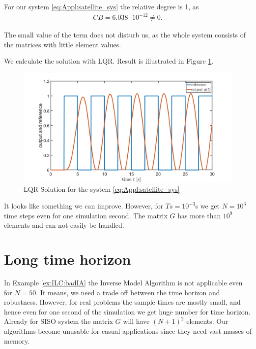 \begin{exam}
For our system \eqref{eq:Appl:satellite_sys} the relative degree is 1, as 
	\begin{align}
	CB = 6.038\cdot 10^{-12} \neq 0. 
	\end{align}

The small value of the term does not disturb us, as the whole system consists of the matrices with little element values. 

We calculate the solution with LQR. Result is illustrated in Figure \ref{img:Appl:ExSat_LQR}.
	
	\begin{figure}[ht]
		\centering
		\includegraphics[width=\textwidth]{fig/ExSat_LQR.jpg}
		\caption{LQR Solution for the system \eqref{eq:Appl:satellite_sys}}
		\label{img:Appl:ExSat_LQR}
	\end{figure}
	
It looks like something we can improve. However, for $Ts = 10^{-3}$s we get $N = 10^3$ time steps even for one simulation second. The matrix $G$ has more than  $10^9$ elements and can not easily be handled.
\end{exam}

\section{Long time horizon}

	In Example \ref{ex:ILC:badIA} the Inverse Model Algorithm is not applicable even for $N = 50$. 
	It means, we need a trade off between the time horizon and robustness.
	However, for real problems the sample times are mostly small, and hence even for one second of the simulation we get huge number for time horizon. Already for SISO system the matrix $G$ will have $(N + 1)^2$ elements. Our algorithms become unusable for casual applications since they need vast masses of memory.	
	
